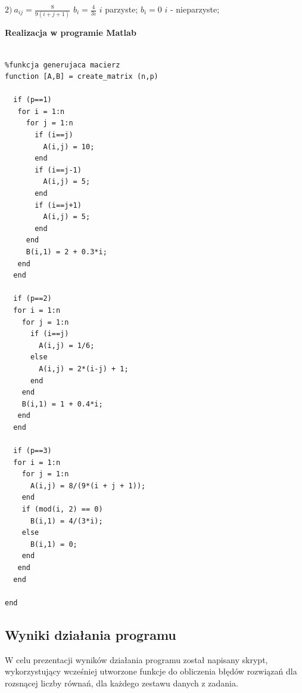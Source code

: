 \documentclass[a4paper, 11pt]{article}
\begin{document}
\hspace{2,4cm} $2) \ a_{ij} = \frac{8}{9(i+j+1)}$  \hspace{1cm} $b_{i} =\frac{4}{3i}$ $i$ parzyste; $b_{i} = 0$ $i$ - nieparzyste; \\

\vspace{1cm}

\textbf{Realizacja w programie Matlab}\\
\\
\begin{lstlisting}
%funkcja generujaca macierz 
function [A,B] = create_matrix (n,p)

  if (p==1)
   for i = 1:n
     for j = 1:n
       if (i==j)
         A(i,j) = 10;
       end
       if (i==j-1)
         A(i,j) = 5;
       end
       if (i==j+1)
         A(i,j) = 5;
       end
     end
     B(i,1) = 2 + 0.3*i;
   end
  end

  if (p==2) 
  for i = 1:n
    for j = 1:n
      if (i==j)
        A(i,j) = 1/6;
      else
        A(i,j) = 2*(i-j) + 1;
      end
    end
    B(i,1) = 1 + 0.4*i;
   end
  end

  if (p==3)
  for i = 1:n
    for j = 1:n
      A(i,j) = 8/(9*(i + j + 1));
    end
    if (mod(i, 2) == 0)
      B(i,1) = 4/(3*i);
    else
      B(i,1) = 0;
    end
   end
  end
  
end
\end{lstlisting}

\subsection{Wyniki działania programu}
W celu prezentacji wyników działania programu został napisany skrypt, wykorzystujący wcześniej utworzone funkcje do obliczenia błędów rozwiązań dla rozsnącej liczby równań, dla każdego zestawu danych z zadania. \\
\vspace{1cm}
\end{document}

